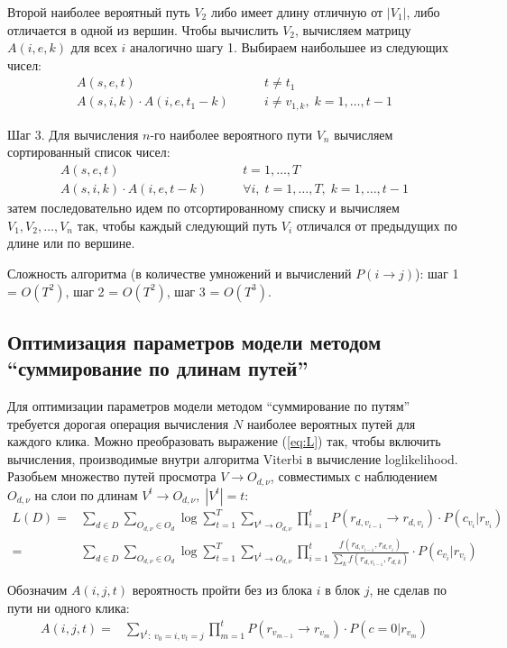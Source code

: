 \documentclass[12pt,a4paper]{article}
\begin{document}
Второй наиболее вероятный путь $V_2$ либо имеет длину отличную от $|V_1|$, либо отличается в одной из вершин. Чтобы вычислить $V_2$, вычисляем матрицу $A(i,e,k)$ для всех $i$ аналогично шагу 1. Выбираем наибольшее из следующих чисел:
\begin{align*}
 A(s,e,t) & \qquad t\ne t_1 \\
 A(s,i,k) \cdot A(i,e,t_1-k) &\qquad i \ne v_{1,k}, \; k=1,\ldots, t-1
\end{align*}

Шаг 3. Для вычисления $n$-го наиболее вероятного пути $V_n$ вычисляем сортированный список чисел:
\begin{align*}
 A(s,e,t) &\qquad t=1,\ldots, T \\
 A(s,i,k) \cdot A(i,e,t-k) &\qquad \forall i, \; t=1,\ldots, T, \; k=1,\ldots, t-1
\end{align*}
затем последовательно идем по отсортированному списку и вычисляем $V_1,V_2,\ldots,V_n$ так, чтобы каждый следующий путь $V_i$ отличался от предыдущих по длине или по вершине.

Сложность алгоритма (в количестве умножений и вычислений $P(i\to j)$): шаг 1 = $O(T^2)$, шаг 2 = $O(T^2)$, шаг 3 = $O(T^3)$.

\subsection{Оптимизация параметров модели методом ``суммирование по длинам путей''}

Для оптимизации параметров модели методом ``суммирование по путям'' требуется дорогая операция вычисления $N$ наиболее вероятных путей для каждого клика. Можно преобразовать выражение (\ref{eq:L}) так, чтобы включить вычисления, производимые внутри алгоритма Viterbi в вычисление loglikelihood. Разобьем множество путей просмотра $V \to O_{d,\nu}$, совместимых с наблюдением $O_{d,\nu}$ на слои по длинам $V^t \to O_{d,\nu}, \; |V^t|=t$:
\begin{align}
L(D) = & \sum_{d \in D} \sum_{O_{d,\nu} \in O_d}
  \log \sum_{t=1}^T \sum_{V^t \to O_{d,\nu}} \prod_{i=1}^t
     P(r_{d,v_{i-1}} \to r_{d,v_i}) \cdot P(c_{v_i} | r_{v_i})
\\
     = & \sum_{d \in D} \sum_{O_{d,\nu} \in O_d}
  \log \sum_{t=1}^T \sum_{V^t \to O_{d,\nu}} \prod_{i=1}^t
     \frac{f(r_{d,v_{i-1}}, r_{d,v_i})}{\sum_k f(r_{d,v_{i-1}}, r_{d,k})}  \cdot P(c_{v_i} | r_{v_i})
\end{align}

Обозначим $A(i,j,t)$ вероятность пройти без из блока $i$ в блок $j$, не сделав по пути ни одного клика:
\begin{align}
A(i,j,t) =& \sum_{V^t:\; v_0=i, v_t=j} \prod_{m=1}^t
  P(r_{v_{m-1}} \to r_{v_m}) \cdot P(c=0 | r_{v_m})
\end{align}
\end{document}
